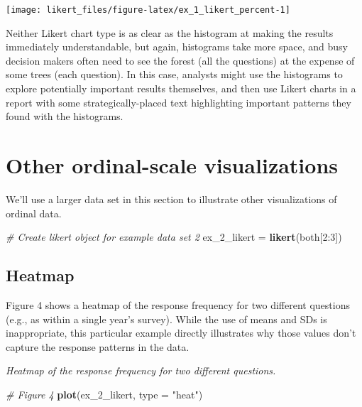 \documentclass[]{book}
\newenvironment{Shaded}{\begin{snugshade}}{\end{snugshade}}
\newcommand{\KeywordTok}[1]{\textcolor[rgb]{0.13,0.29,0.53}{\textbf{{#1}}}}
\newcommand{\DataTypeTok}[1]{\textcolor[rgb]{0.13,0.29,0.53}{{#1}}}
\newcommand{\DecValTok}[1]{\textcolor[rgb]{0.00,0.00,0.81}{{#1}}}
\newcommand{\StringTok}[1]{\textcolor[rgb]{0.31,0.60,0.02}{{#1}}}
\newcommand{\CommentTok}[1]{\textcolor[rgb]{0.56,0.35,0.01}{\textit{{#1}}}}
\newcommand{\NormalTok}[1]{{#1}}
\begin{document}
\begin{center}\texttt{[image: likert\_files/figure-latex/ex\_1\_likert\_percent-1]} \end{center}

Neither Likert chart type is as clear as the histogram at making the
results immediately understandable, but again, histograms take more
space, and busy decision makers often need to see the forest (all the
questions) at the expense of some trees (each question). In this case,
analysts might use the histograms to explore potentially important
results themselves, and then use Likert charts in a report with some
strategically-placed text highlighting important patterns they found
with the histograms.

\section{Other ordinal-scale
visualizations}\label{other-ordinal-scale-visualizations}

We'll use a larger data set in this section to illustrate other
visualizations of ordinal data.

\begin{Shaded}
\begin{Highlighting}[]
\CommentTok{# Create likert object for example data set 2}
\NormalTok{ex_2_likert =}\StringTok{ }\KeywordTok{likert}\NormalTok{(both[}\DecValTok{2}\NormalTok{:}\DecValTok{3}\NormalTok{])}
\end{Highlighting}
\end{Shaded}

\subsection{Heatmap}\label{heatmap}

Figure 4 shows a heatmap of the response frequency for two different
questions (e.g., as within a single year's survey). While the use of
means and SDs is inappropriate, this particular example directly
illustrates why those values don't capture the response patterns in the
data.

\emph{Heatmap of the response frequency for two different questions.}

\begin{Shaded}
\begin{Highlighting}[]
\CommentTok{# Figure 4}
\KeywordTok{plot}\NormalTok{(ex_2_likert, }\DataTypeTok{type =} \StringTok{"heat"}\NormalTok{)}
\end{Highlighting}
\end{Shaded}
\end{document}
